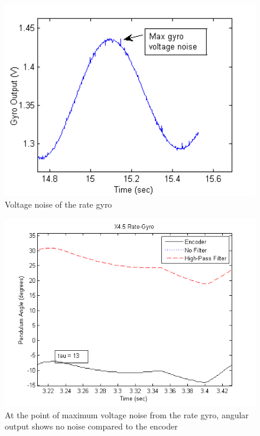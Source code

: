 \documentclass{article}
\theoremstyle{plain}
\theoremstyle{definition}
\theoremstyle{remark}
\begin{document}
\begin{figure}[hbt]
\begin{center}
\includegraphics[width = 12cm]{Example_Gyro_Noise.png}
\caption{Voltage noise of the rate gyro}
\label{gyroNoise}
\end{center}
\end{figure}

\begin{figure}[hbt]
\begin{center}
\includegraphics[width = 13cm]{Example_Gyro_AngleNoise.png}
\caption{At the point of maximum voltage noise from the rate gyro, angular output shows no noise compared to the encoder}
\label{gyroAngleNoise}
\end{center}
\end{figure}
\end{document}
